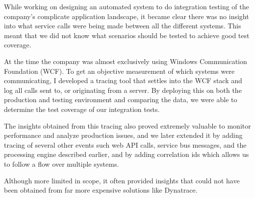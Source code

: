 \documentclass[10pt,a4paper]{../altacv}
\begin{document}
\begin{fullwidth}
\bigskip\bigskip

While working on designing an automated system to do integration testing of the company’s complicate application landscape, it became clear there was no insight into what service calls were being made between all the different systems. This meant that we did not know what scenarios should be tested to achieve good test coverage.

\medskip\medskip

At the time the company was almost exclusively using Windows Communication Foundation (WCF). To get an objective measurement of which systems were communicating, I developed a tracing tool that settles into the WCF stack and log all calls sent to, or originating from a server. By deploying this on both the production and testing environment and comparing the data, we were able to determine the test coverage of our integration tests.

\medskip\medskip

The insights obtained from this tracing also proved extremely valuable to monitor performance and analyze production issues, and we later extended it by adding tracing of several other events such web API calls, service bus messages, and the processing engine described earlier, and by adding correlation ids which allows us to follow a flow over multiple systems.

\medskip\medskip

Although more limited in scope, it often provided insights that could not have been obtained from far more expensive solutions like Dynatrace.





\newpage




\medskip\medskip


\medskip\medskip



\end{fullwidth}
\end{document}
